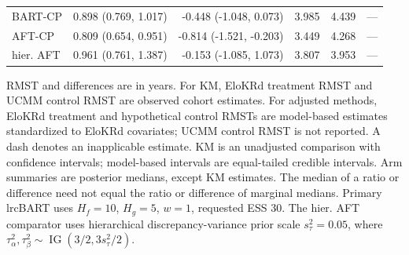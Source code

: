\begin{landscape}
\begin{longtable}{lrrrrr}
BART-CP & 0.898 (0.769, 1.017) & -0.448 (-1.048, 0.073) & 3.985 & 4.439 & --- \\
AFT-CP & 0.809 (0.654, 0.951) & -0.814 (-1.521, -0.203) & 3.449 & 4.268 & --- \\
hier. AFT & 0.961 (0.761, 1.387) & -0.153 (-1.085, 1.073) & 3.807 & 3.953 & --- \\
\end{longtable}
\noindent\begin{minipage}{\linewidth}\footnotesize RMST and differences are in years. For KM, EloKRd treatment RMST and UCMM control RMST are observed cohort estimates. For adjusted methods, EloKRd treatment and hypothetical control RMSTs are model-based estimates standardized to EloKRd covariates; UCMM control RMST is not reported. A dash denotes an inapplicable estimate. KM is an unadjusted comparison with confidence intervals; model-based intervals are equal-tailed credible intervals. Arm summaries are posterior medians, except KM estimates. The median of a ratio or difference need not equal the ratio or difference of marginal medians. Primary lrcBART uses $H_f=10$, $H_g=5$, $w=1$, requested ESS 30. The hier. AFT comparator uses hierarchical discrepancy-variance prior scale $s_\tau^2=0.05$, where $\tau_\alpha^2,\tau_\beta^2\sim\operatorname{IG}(3/2,3s_\tau^2/2)$.\end{minipage}
\endgroup
\end{landscape}
